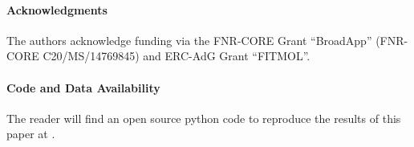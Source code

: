 \documentclass[aps, prl, twocolumn, groupedaddress, reprint, floatfix, nofootinbib, longbibliography]{revtex4-2}
\newcommand{\github}[1]{\href{#1}{\faGithubSquare}}
\newcommand{\esrgithub}{\github{https://github.com/MatthieuSarkis/magic_molecules}}
\begin{document}
\vspace{1em}
\paragraph*{Acknowledgments}

    The authors acknowledge funding via the FNR-CORE Grant ``BroadApp'' (FNR-CORE C20/MS/14769845) and ERC-AdG Grant ``FITMOL''.

\vspace{1em}
\paragraph*{Code and Data Availability}

    The reader will find an open source python code to reproduce the results of this paper at \esrgithub.

%
\nocite{*}

\end{document}
